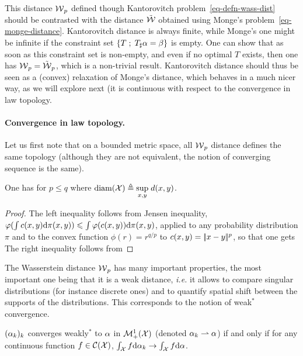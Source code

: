 This distance $\operatorname{\mathcal{W}}_p$ defined though Kantorovitch problem~\eqref{eq-defn-wass-dist} should be contrasted with the distance $\tilde{\operatorname{\mathcal{W}}}$ obtained using Monge's problem~\eqref{eq-monge-distance}. Kantorovitch distance is always finite, while Monge's one might be infinite if the constraint set $\left\{ T \;;\; T_\sharp \alpha=\beta \right\}$ is empty. One can show that as soon as this constraint set is non-empty, and even if no optimal $T$ exists, then one has $\operatorname{\mathcal{W}}_p = \tilde{\operatorname{\mathcal{W}}}_p$, which is a non-trivial result. Kantorovitch distance should thus be seen as a (convex) relaxation of Monge's distance, which behaves in a much nicer way, as we will explore next (it is continuous with respect to the convergence in law topology.


\paragraph{Convergence in law topology.}

Let us first note that on a bounded metric space, all $\operatorname{\mathcal{W}}_p$ distance defines the same topology (although they are not equivalent, the notion of converging sequence is the same).

\begin{prop}\label{prop-comp-wass-p}
	One has for $p \leq q$
	where $\text{\upshape diam}(\mathcal{X}) \triangleq \underset{x,y}{\sup}\; d(x,y)$.
\end{prop}
\begin{proof}
	The left inequality follows from Jensen inequality, $\varphi(\int c(x,y) \mathrm{d}\pi(x,y)) \leqslant \int \varphi(c(x,y)) \mathrm{d}\pi(x,y)$, applied to any probability distribution $\pi$ and to the convex function $\phi(r)=r^{q/p}$ to $c(x,y)=|\!| x-y |\!|^p$, so that one gets
	The right inequality follows from
\end{proof}

The Wasserstein distance $\operatorname{\mathcal{W}}_p$ has many important properties, the most important one being that it is a weak distance, \emph{i.e.} it allows to compare singular distributions (for instance discrete ones) and to quantify spatial shift between the supports of the distributions. This corresponds to the notion of weak$^*$ convergence.

\begin{defn}\label{dfn-weak-conv}
	$(\alpha_k)_k$ converges weakly$^*$ to $\alpha$ in $\mathcal{M}_+^1(\mathcal{X})$ (denoted $\alpha_k \rightharpoonup \alpha$) if and only if for any continuous function $f \in \mathcal{C}(\mathcal{X})$, $\int_{\mathcal{X}} f \mathrm{d}\alpha_k \rightarrow \int_{\mathcal{X}} f \mathrm{d}\alpha$.
\end{defn}

